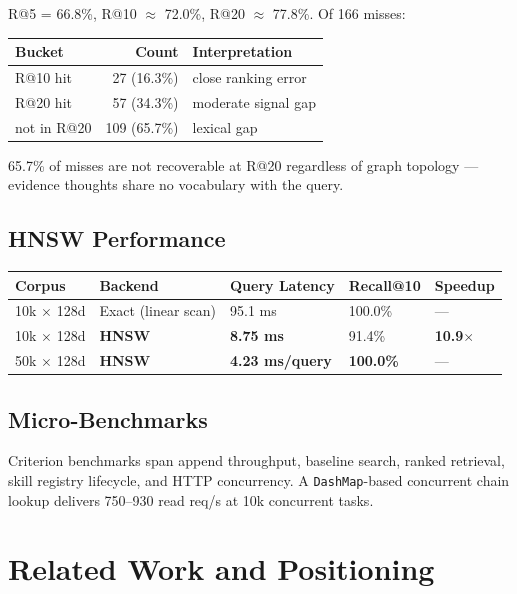 \documentclass[11pt,a4paper]{article}
\begin{document}
R@5 = 66.8\%, R@10 $\approx$ 72.0\%, R@20 $\approx$ 77.8\%. Of 166 misses:

\begin{tabular}{lrl}
\toprule
Bucket & Count & Interpretation \\
\midrule
R@10 hit & 27 (16.3\%) & close ranking error \\
R@20 hit & 57 (34.3\%) & moderate signal gap \\
not in R@20 & 109 (65.7\%) & lexical gap \\
\bottomrule
\end{tabular}

65.7\% of misses are not recoverable at R@20 regardless of graph topology — evidence
thoughts share no vocabulary with the query.

\subsection{HNSW Performance}

\begin{tabular}{lllll}
\toprule
Corpus & Backend & Query Latency & Recall@10 & Speedup \\
\midrule
10k $\times$ 128d & Exact (linear scan) & 95.1 ms & 100.0\% & — \\
10k $\times$ 128d & \textbf{HNSW} & \textbf{8.75 ms} & 91.4\% & \textbf{10.9$\times$} \\
50k $\times$ 128d & \textbf{HNSW} & \textbf{4.23 ms/query} & \textbf{100.0\%} & — \\
\bottomrule
\end{tabular}

\subsection{Micro-Benchmarks}

Criterion benchmarks span append throughput, baseline search, ranked retrieval, skill
registry lifecycle, and HTTP concurrency. A \texttt{DashMap}-based concurrent chain lookup
delivers 750–930 read req/s at 10k concurrent tasks.

\section{Related Work and Positioning}
\end{document}

